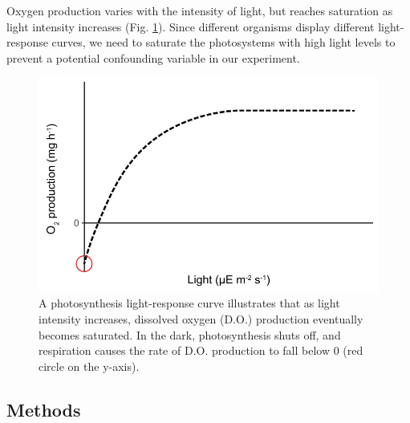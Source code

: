 \documentclass[]{krantz}
\theoremstyle{definition}
\theoremstyle{definition}
\theoremstyle{definition}
\theoremstyle{remark}
\begin{document}
Oxygen production varies with the intensity of light, but reaches
saturation as light intensity increases (Fig.
\ref{fig:light-response-fig}). Since different organisms display
different light-response curves, we need to saturate the photosystems
with high light levels to prevent a potential confounding variable in
our experiment.

\begin{figure}
\centering
\includegraphics{chapter_materials/physiological_ecology/light_response_curve.pdf}
\caption{\label{fig:light-response-fig}A photosynthesis light-response curve
illustrates that as light intensity increases, dissolved oxygen (D.O.)
production eventually becomes saturated. In the dark, photosynthesis
shuts off, and respiration causes the rate of D.O. production to fall
below 0 (red circle on the y-axis).}
\end{figure}

\subsection{Methods}\label{methods}
\end{document}
